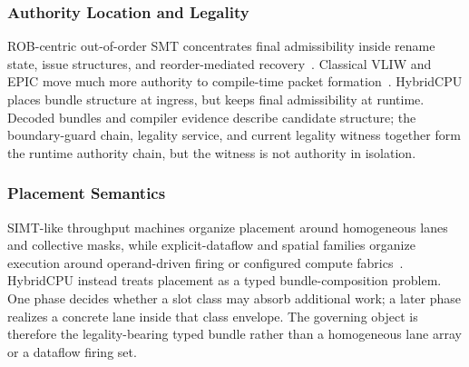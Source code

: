 \documentclass[twocolumn]{article}
\begin{document}
\subsubsection{Authority Location and Legality}

ROB-centric out-of-order SMT concentrates final admissibility inside rename state, issue structures, and reorder-mediated recovery~\cite{tomasulo1967efficient,palacharla1997complexity,smith1995microarchitecture}. Classical VLIW and EPIC move much more authority to compile-time packet formation~\cite{fisher1983vliw,schlansker2000epic}. HybridCPU places bundle structure at ingress, but keeps final admissibility at runtime. Decoded bundles and compiler evidence describe candidate structure; the boundary-guard chain, legality service, and current legality witness together form the runtime authority chain, but the witness is not authority in isolation.


\subsubsection{Placement Semantics}

SIMT-like throughput machines organize placement around homogeneous lanes and collective masks, while explicit-dataflow and spatial families organize execution around operand-driven firing or configured compute fabrics~\cite{keckler2011gpus,sankaralingam2003trips,prabhakar2017plasticine,govindaraju2012dyser}. HybridCPU instead treats placement as a typed bundle-composition problem. One phase decides whether a slot class may absorb additional work; a later phase realizes a concrete lane inside that class envelope. The governing object is therefore the legality-bearing typed bundle rather than a homogeneous lane array or a dataflow firing set.
\end{document}
